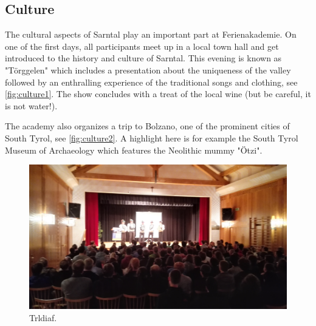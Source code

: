 \subsection{Culture}
The cultural aspects of Sarntal play an important part at Ferienakademie. On one of the first days, all participants meet up in a local town hall and get introduced to the history and culture of Sarntal. This evening is known as "Törggelen" which includes a presentation about the uniqueness of the valley followed by an enthralling experience of the traditional songs and clothing, see \autoref{fig:culture1}. The show concludes with a treat of the local wine (but be careful, it is not water!). 

The academy also organizes a trip to Bolzano, one of the prominent cities of South Tyrol, see \autoref{fig:culture2}. A highlight here is for example the South Tyrol Museum of Archaeology which features the Neolithic mummy "Ötzi".
\begin{figure}[ht]%
 	\begin{center}%
 		\includegraphics[scale=0.045]{img/Culture1.jpg}%
 		\caption{Trldiaf.}\label{fig:culture1}%
 	\end{center}%
\end{figure} 

